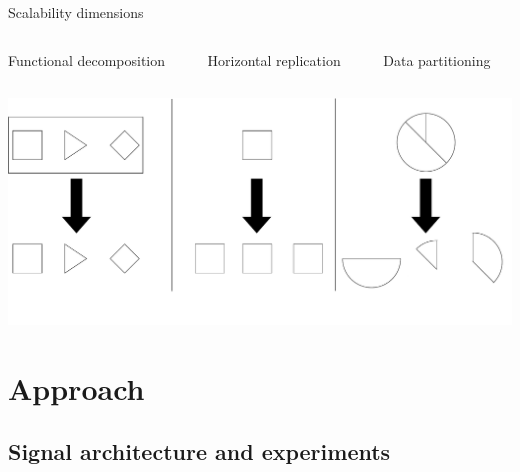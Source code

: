 \documentclass{beamer}
\begin{document}
\begin{frame}{Scalability dimensions}
    \begin{columns}
        \begin{column}{.3\textwidth}
            \centering
            Functional decomposition
        \end{column}
        \begin{column}{.3\textwidth}
            \centering
            Horizontal replication
        \end{column}
        \begin{column}{.3\textwidth}
            \centering
            Data partitioning
        \end{column}
    \end{columns}
    \vfill
    \centering
    \includegraphics[width=\textwidth]{img/dimensions}
\end{frame}

\section{Approach}

\subsection{Signal architecture and experiments}
\end{document}
